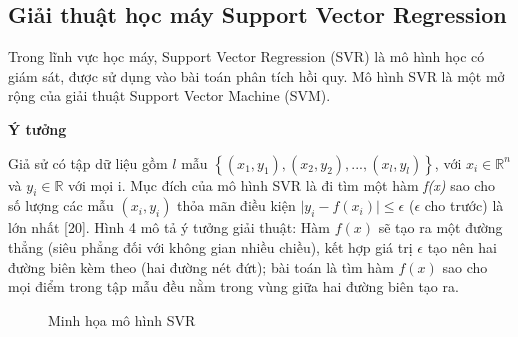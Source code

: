 \documentclass[12pt]{extarticle}
\begin{document}
		\subsection{Giải thuật học máy Support Vector Regression}
			\par Trong lĩnh vực học máy, Support Vector Regression (SVR) là mô hình học có giám sát, được sử dụng vào bài toán phân tích hồi quy. Mô hình SVR là một mở rộng của giải thuật Support Vector Machine (SVM).
			\par \textbf{Ý tưởng}
				\par Giả sử có tập dữ liệu gồm $l$ mẫu $\left\{\left(x_{1},y_{1}\right),\left(x_{2},y_{2}\right),...,\left(x_{l},y_{l}\right)\right\}$, với $x_{i}\in  \mathbb{R}^{n}$ và $y_{i}\in  \mathbb{R}$ với mọi i. Mục đích của mô hình SVR là đi tìm một hàm \textit{f(x)} sao cho số lượng các mẫu $\left(x_{i},y_{i}\right)$ thỏa mãn điều kiện $\mid y_{i} - f(x_{i})\mid \leq \epsilon $ ($\epsilon$ cho trước) là lớn nhất [20]. Hình 4 mô tả ý tưởng giải thuật: Hàm $f(x)$ sẽ tạo ra một đường thẳng (siêu phẳng đối với không gian nhiều chiều), kết hợp giá trị $\epsilon$ tạo nên hai đường biên kèm theo (hai đường nét đứt); bài toán là tìm hàm $f(x)$ sao cho mọi điểm trong tập mẫu đều nằm trong vùng giữa hai đường biên tạo ra.
				\begin{figure}[h!]
				\begin{center}
				\end{center}
					\caption{Minh họa mô hình SVR}
				\label{fig:foody}
			\end{figure}
\end{document}
